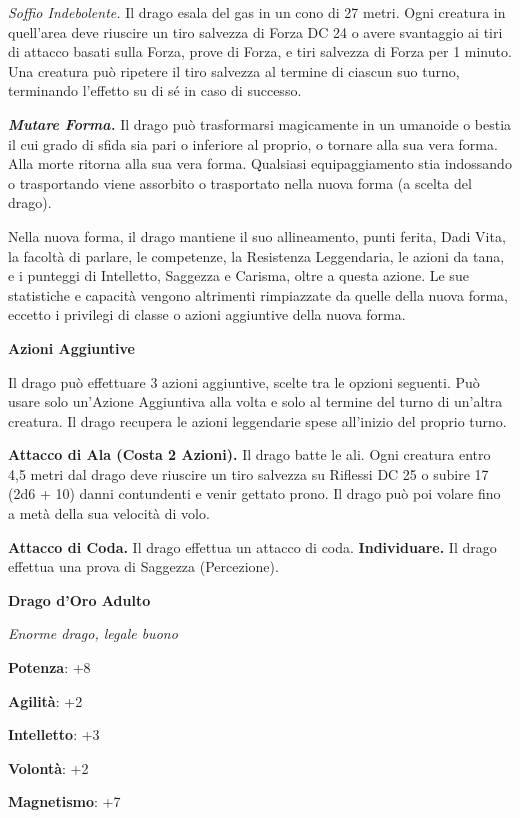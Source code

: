 \begin{multicols}{2}
\emph{Soffio Indebolente.} Il drago esala del gas in un cono di 27
metri. Ogni creatura in quell'area deve riuscire un tiro salvezza di Forza DC 24 o avere svantaggio ai tiri di attacco basati sulla Forza,
prove di Forza, e tiri salvezza di Forza per 1 minuto. Una creatura può
ripetere il tiro salvezza al termine di ciascun suo turno, terminando
l'effetto su di sé in caso di successo.

\emph{\textbf{Mutare Forma.}} Il drago può trasformarsi magicamente in
un umanoide o bestia il cui grado di sfida sia pari o inferiore al
proprio, o tornare alla sua vera forma. Alla morte ritorna alla sua vera
forma. Qualsiasi equipaggiamento stia indossando o trasportando viene
assorbito o trasportato nella nuova forma (a scelta del drago).

Nella nuova forma, il drago mantiene il suo allineamento, punti ferita,
Dadi Vita, la facoltà di parlare, le competenze, la Resistenza
Leggendaria, le azioni da tana, e i punteggi di Intelletto, Saggezza e
Carisma, oltre a questa azione. Le sue statistiche e capacità vengono
altrimenti rimpiazzate da quelle della nuova forma, eccetto i privilegi
di classe o azioni aggiuntive della nuova forma.

\textbf{Azioni Aggiuntive}

Il drago può effettuare 3 azioni aggiuntive, scelte tra le opzioni
seguenti. Può usare solo un'Azione Aggiuntiva alla volta e solo al
termine del turno di un'altra creatura. Il drago recupera le azioni
leggendarie spese all'inizio del proprio turno.

\textbf{Attacco di Ala (Costa 2 Azioni).} Il drago batte le ali. Ogni
creatura entro 4,5 metri dal drago deve riuscire un tiro salvezza su Riflessi DC 25 o subire 17 (2d6 + 10) danni contundenti e venir gettato
prono. Il drago può poi volare fino a metà della sua velocità di volo.

\textbf{Attacco di Coda.} Il drago effettua un attacco di coda.
\textbf{Individuare.} Il drago effettua una prova di Saggezza
(Percezione).



\textbf{Drago d'Oro Adulto}

\emph{Enorme drago, legale buono}

\textbf{Potenza}: +8

\textbf{Agilità}: +2

\textbf{Intelletto}: +3

\textbf{Volontà}: +2

\textbf{Magnetismo}: +7


\end{multicols}
